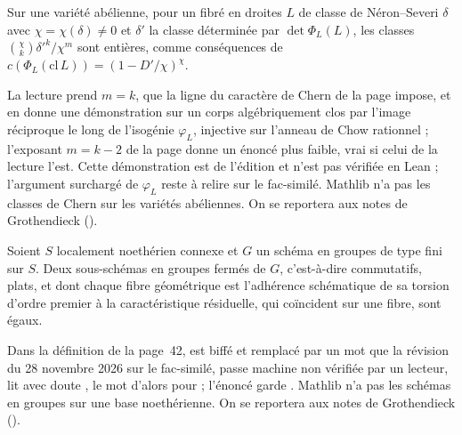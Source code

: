 \begin{encadre}
\begin{conjecture*}
Sur une variété abélienne, pour un fibré en droites $L$ de classe de Néron--Severi $\delta$ avec $\chi = \chi(\delta) \neq 0$ et $\delta'$ la classe déterminée par $\det \Phi_L(L)$, les classes $\binom{\chi}{k}\delta'^k/\chi^m$ sont entières, comme conséquences de $c(\Phi_L(\mathrm{cl}\,L)) = (1 - D'/\chi)^\chi$.
\end{conjecture*}
\end{encadre}
{\small La lecture prend $m = k$, que la ligne du caractère de Chern de la page impose, et en donne une démonstration sur un corps algébriquement clos par l'image réciproque le long de l'isogénie $\varphi_L$, injective sur l'anneau de Chow rationnel ; l'exposant $m = k - 2$ de la page donne un énoncé plus faible, vrai si celui de la lecture l'est. Cette démonstration est de l'édition et n'est pas vérifiée en Lean ; l'argument surchargé de $\varphi_L$ reste à relire sur le fac-similé. Mathlib n'a pas les classes de Chern sur les variétés abéliennes. On se reportera aux notes de Grothendieck ().\par}

\begin{encadre}
\begin{theoreme*}\nonverifie
Soient $S$ localement noethérien connexe et $G$ un schéma en groupes de type fini sur $S$. Deux sous-schémas en groupes fermés  de $G$, c'est-à-dire commutatifs, plats, et dont chaque fibre géométrique est l'adhérence schématique de sa torsion d'ordre premier à la caractéristique résiduelle, qui coïncident sur une fibre, sont égaux.
\end{theoreme*}
\end{encadre}
{\small Dans la définition de la page~42,  est biffé et remplacé par un mot que la révision du 28 novembre 2026 sur le fac-similé, passe machine non vérifiée par un lecteur, lit avec doute , le mot d'alors pour  ; l'énoncé garde . Mathlib n'a pas les schémas en groupes sur une base noethérienne. On se reportera aux notes de Grothendieck ().\par}

